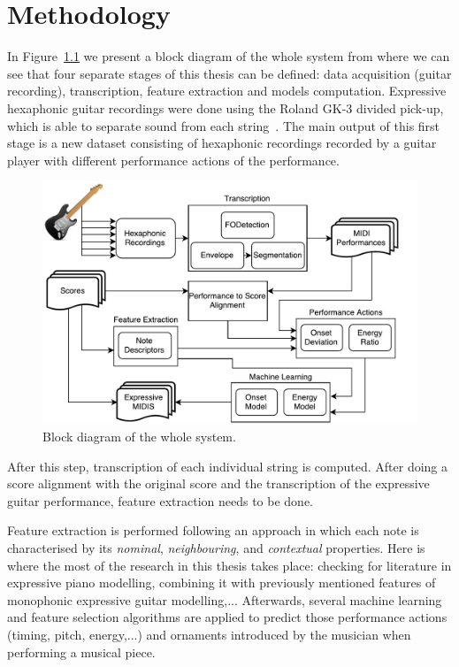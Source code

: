 \chapter{Methodology}
\label{chap:methods}
In Figure~\ref{fig:diagram} we present a block diagram of the whole system from where we can see that four separate stages of this thesis can be defined: data acquisition (guitar recording), transcription, feature extraction and models computation. Expressive hexaphonic guitar recordings were done using the Roland GK-3 divided pick-up, which is able to separate sound from each string~\cite{Angulo2016}. The main output of this first stage is a new dataset consisting of hexaphonic recordings recorded by a guitar player with different performance actions of the performance. 

\begin{figure}[ht!]
\centering
\includegraphics[width=\textwidth]{Figures/Diagram.pdf}
\caption{Block diagram of the whole system.}
\label{fig:diagram}
\end{figure}

After this step, transcription of each individual string is computed. After doing a score alignment with the original score and the transcription of the expressive guitar performance, feature extraction needs to be done.

Feature extraction is performed following an approach in which each note is characterised by its \textit{nominal}, \textit{neighbouring}, and \textit{contextual} properties.  Here is where the most of the research in this thesis takes place:  checking for literature in expressive piano modelling, combining it with previously mentioned features of monophonic expressive guitar modelling,... Afterwards, several machine learning and feature selection algorithms are applied to predict those performance actions (timing, pitch, energy,...) and ornaments introduced by the musician when performing a musical piece.


